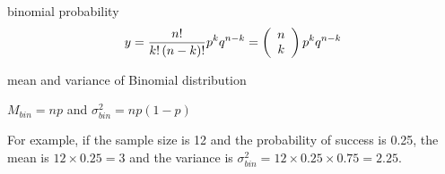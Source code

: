 \documentclass[IntroMain.tex]{subfiles}
\begin{document}
\begin{frame}
	binomial probability
	\[y = \frac{{n!}}{{k!\left( {n - k} \right)!}}p^k q^{n - k} = \left( {\begin{array}{*{20}c} n \\ k \\ \end{array}} \right)p^k q^{n -
		k}\]
	
	mean and variance of Binomial distribution
	
	$M_{bin} = np$  and $\sigma ^2 _{bin} = np(1-p)$
	
	For example, if the sample size is 12 and the probability of
	success is 0.25, the mean is $12 \times 0.25 = 3$ and the variance
	is $\sigma ^2 _{bin} = 12 \times 0.25 \times 0.75 = 2.25$.
\end{frame}
\end{document}
